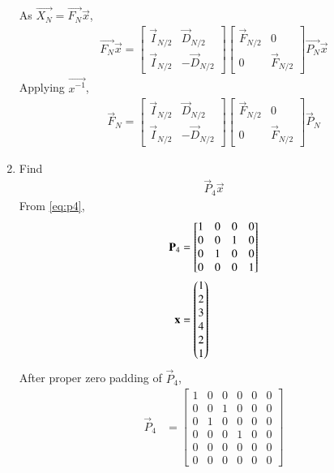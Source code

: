 \documentclass[journal,12pt,twocolumn]{IEEEtran}
\renewcommand\thesection{\arabic{section}}
\begin{document}
\begin{enumerate}[label=\arabic*.,ref=\thesection.\theenumi]
\begin{equation}
	\end{equation}
	As $\vec{X_N}=\vec{F_N}\vec{x}$,
	\begin{align}
		\vec{F_N}\vec{x}=
		\begin{bmatrix}
			\vec{I}_{N/2} & \vec{D}_{N/2} \\
			\vec{I}_{N/2} & -\vec{D}_{N/2}
		\end{bmatrix}
		\begin{bmatrix}
			\vec{F}_{N/2} & 0 \\
			0 & \vec{F}_{N/2}
		\end{bmatrix}\vec{P_N}\vec{x}
	\end{align}
	Applying $\vec{x^{-1}}$,
	\begin{align}
		\label{eq:final}
		\vec{F}_{N}=
		\begin{bmatrix}
			\vec{I}_{N/2} & \vec{D}_{N/2} \\
			\vec{I}_{N/2} & -\vec{D}_{N/2}
		\end{bmatrix}
		\begin{bmatrix}
			\vec{F}_{N/2} & 0 \\
			0 & \vec{F}_{N/2}
		\end{bmatrix}
		\vec{P}_{N}
	\end{align}
	\item Find 
	\begin{align}
		\vec{P}_4 \vec{x}
	\end{align}
	\solution From \eqref{eq:p4},
	\begin{align}
		\mathbf{P}_4&=\begin{bmatrix}
			1&0&0&0\\0&0&1&0\\0&1&0&0\\0&0&0&1
		\end{bmatrix}\\
		\mathbf{x}&=\begin{pmatrix}1\\2\\3\\4\\2\\1\end{pmatrix}
	\end{align}
	After proper zero padding of $\vec{P}_4$,
	\begin{align}
		\vec{P}_4&=\begin{bmatrix}
			1&0&0&0&0&0\\0&0&1&0&0&0\\0&1&0&0&0&0\\0&0&0&1&0&0\\0&0&0&0&0&0\\0&0&0&0&0&0
		\end{bmatrix}\\

\end{align}
\end{enumerate}
\end{document}
